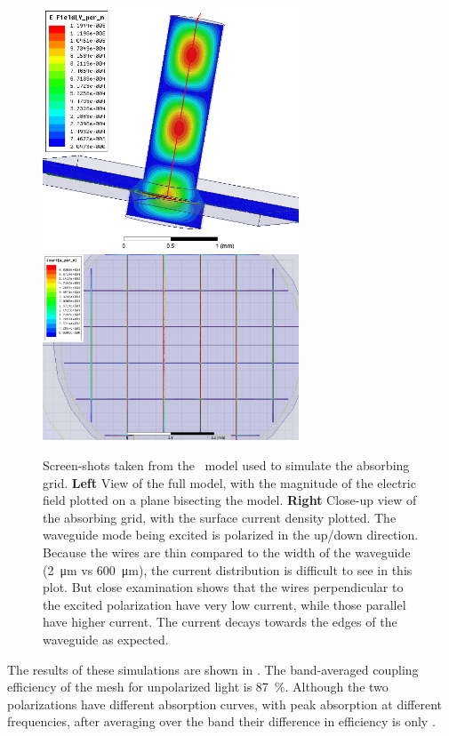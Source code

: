 \begin{figure}
\centering
\includegraphics[width=3in]{images/ch4-hfss-model.png}
\includegraphics[width=3in]{images/ch4-hfss-grid.png}
\caption[\HFSS\ model]{
  Screen-shots taken from the \HFSS\ model used to simulate the absorbing grid.
  \textbf{Left}
  View of the full model, with the magnitude of the electric field plotted on a plane bisecting the model.
  \textbf{Right}
  Close-up view of the absorbing grid, with the surface current density plotted.
  The waveguide mode being excited is polarized in the up/down direction.
  Because the wires are thin compared to the width of the waveguide (\SI{2}{\um} vs \SI{600}{\um}), the current distribution is difficult to see in this plot.
  But close examination shows that the wires perpendicular to the excited polarization have very low current, while those parallel have higher current.
  The current decays towards the edges of the waveguide as expected.
}
\label{fig:ch4-hfss-model}
\end{figure}

The results of these simulations are shown in .
The band-averaged coupling efficiency of the mesh for unpolarized light is \SI{87}{\percent}.
Although the two polarizations have different absorption curves, with peak absorption at different frequencies, after averaging over the band their difference in efficiency is only .

